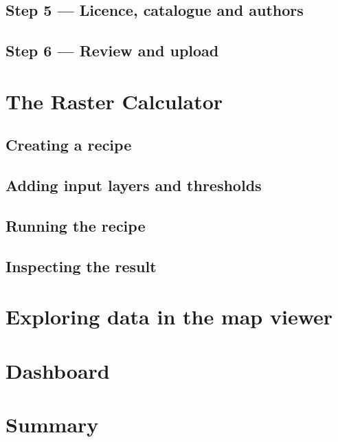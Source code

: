 \documentclass[
  10pt,
  b5paper,
  oneside]{book}
\begin{document}
\subsection{Step 5 --- Licence, catalogue and authors}\label{step-5-licence-catalogue-and-authors}

\subsection{Step 6 --- Review and upload}\label{step-6-review-and-upload}

\section{The Raster Calculator}\label{the-raster-calculator}

\subsection{Creating a recipe}\label{creating-a-recipe}

\subsection{Adding input layers and thresholds}\label{adding-input-layers-and-thresholds}

\subsection{Running the recipe}\label{running-the-recipe}

\subsection{Inspecting the result}\label{inspecting-the-result}

\section{Exploring data in the map viewer}\label{explore-viewer}

\section{Dashboard}\label{dashboard}

\section{Summary}\label{summary-1}
\end{document}

